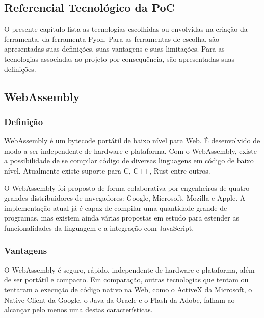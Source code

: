 \begin{apendicesenv}

\partapendices

%
%

\chapter[Referencial Tecnológico da PoC]{Referencial Tecnológico da PoC}
\label{apendice:referencial_tecnologico_poc}

O presente capítulo lista as tecnologias escolhidas ou envolvidas na criação da ferramenta.
da ferramenta Pyon. Para as ferramentas de escolha, são apresentadas suas definições, suas vantagens e
suas limitações. Para as tecnologias associadas ao projeto por consequência, são apresentadas suas
definições.

\section{WebAssembly}

\subsection{Definição}

WebAssembly é um bytecode portátil de baixo nível para Web. É desenvolvido de modo a ser independente de hardware e plataforma. Com o WebAssembly, existe a possibilidade de se compilar código de diversas linguagens em código de baixo nível. Atualmente existe suporte para C, C++, Rust entre outros.

O WebAssembly foi proposto de forma colaborativa por engenheiros de quatro grandes distribuidores de navegadores: Google, Microsoft, Mozilla e Apple. A implementação atual já é capaz de compilar uma quantidade grande de programas, mas existem ainda várias propostas em estudo para estender as funcionalidades da linguagem e a integração com JavaScript.

\subsection{Vantagens}

O WebAssembly é seguro, rápido, independente de hardware e plataforma, além de ser portátil e compacto. Em comparação, outras tecnologias que tentam ou tentaram a execução de código nativo na Web, como o ActiveX da Microsoft, o Native Client da Google, o Java da Oracle e o Flash da Adobe, falham ao alcançar pelo menos uma destas características.


\end{apendicesenv}
